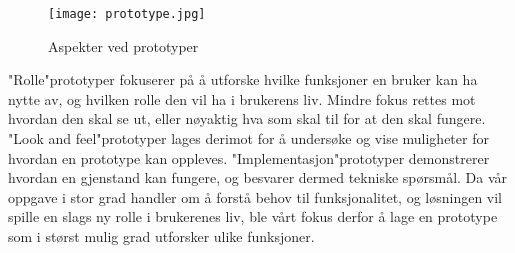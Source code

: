 \begin{figure}[H]
\centering
\texttt{[image: prototype.jpg]}
\caption{Aspekter ved prototyper}
\label{fig: prototype}
\end{figure}

\noindent
"Rolle"\-prototyper fokuserer på å utforske hvilke funksjoner en bruker kan ha nytte av, og hvilken rolle den vil ha i brukerens liv. Mindre fokus rettes mot hvordan den skal se ut, eller nøyaktig hva som skal til for at den skal fungere. "Look and feel"\-prototyper lages derimot for å undersøke og vise muligheter for hvordan en prototype kan oppleves. "Implementasjon"\-prototyper demonstrerer hvordan en gjenstand kan fungere, og besvarer dermed tekniske spørsmål. Da vår oppgave i stor grad handler om å forstå behov til funksjonalitet, og løsningen vil spille en slags ny rolle i brukerenes liv, ble vårt fokus derfor å lage en prototype som i størst mulig grad utforsker ulike funksjoner.


